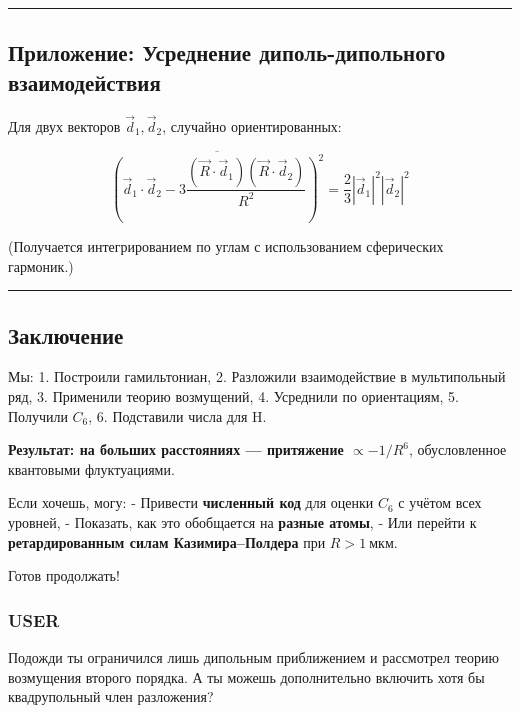 \documentclass[11pt]{article}
\begin{document}
\begin{center}\rule{0.5\linewidth}{\linethickness}\end{center}

\subsection{Приложение: Усреднение диполь-дипольного
взаимодействия}\label{ux43fux440ux438ux43bux43eux436ux435ux43dux438ux435-ux443ux441ux440ux435ux434ux43dux435ux43dux438ux435-ux434ux438ux43fux43eux43bux44c-ux434ux438ux43fux43eux43bux44cux43dux43eux433ux43e-ux432ux437ux430ux438ux43cux43eux434ux435ux439ux441ux442ux432ux438ux44f}

Для двух векторов \(\vec{d}_1, \vec{d}_2\), случайно ориентированных:

\[
\overline{ \left( \vec{d}_1 \cdot \vec{d}_2 - 3 \frac{(\vec{R} \cdot \vec{d}_1)(\vec{R} \cdot \vec{d}_2)}{R^2} \right)^2 } = \frac{2}{3} |\vec{d}_1|^2 |\vec{d}_2|^2
\]

(Получается интегрированием по углам с использованием сферических
гармоник.)

\begin{center}\rule{0.5\linewidth}{\linethickness}\end{center}

\subsection{Заключение}\label{ux437ux430ux43aux43bux44eux447ux435ux43dux438ux435-1}

Мы: 1. Построили гамильтониан, 2. Разложили взаимодействие в
мультипольный ряд, 3. Применили теорию возмущений, 4. Усреднили по
ориентациям, 5. Получили \(C_6\), 6. Подставили числа для H.

\textbf{Результат: на больших расстояниях --- притяжение
\(\propto -1/R^6\)}, обусловленное квантовыми флуктуациями.

Если хочешь, могу: - Привести \textbf{численный код} для оценки \(C_6\)
с учётом всех уровней, - Показать, как это обобщается на \textbf{разные
атомы}, - Или перейти к \textbf{ретардированным силам Казимира--Полдера}
при \(R > 1~\text{мкм}\).

Готов продолжать!

\subsubsection{USER}\label{user-3}

Подожди ты ограничился лишь дипольным приближением и рассмотрел теорию
возмущения второго порядка. А ты можешь дополнительно включить хотя бы
квадрупольный член разложения?
\end{document}
